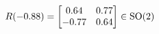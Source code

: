 \documentclass[preview]{standalone}
\begin{document}
\begin{align*}
\special{dvisvgm:raw <g id='unique000'>}R(-0.88) = \begin{bmatrix} 0.64 & 0.77 \\ -0.77 & 0.64 \end{bmatrix} \in \text{SO}(2)\special{dvisvgm:raw </g>}
\end{align*}
\end{document}
